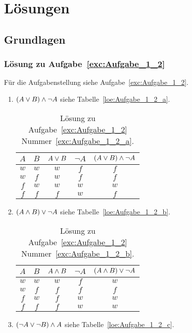 \chapter{Lösungen}
\section{Grundlagen}
\subsection{Lösung zu Aufgabe~\ref{exc:Aufgabe_1_2}}
Für die Aufgabenstellung siehe Aufgabe~\vref{exc:Aufgabe_1_2}.
\label{loe:Aufgabe_1_2}
\begin{enumerate}
\item $\left(A \vee B\right) \wedge \neg A$ siehe Tabelle~\vref{loe:Aufgabe_1_2_a}.
	\begin{table}[htb]
	\center
	\begin{tabular}{c|c||c|c|c}
	$A$ & $B$ & $A \vee B$ & $\neg A$ & $\left(A \vee B\right) \wedge \neg A$\\\hline
	$w$ & $w$ & $w$ & $f$ & $f$\\
	$w$ & $f$ & $w$ & $f$ & $f$\\
	$f$ & $w$ & $w$ & $w$ & $w$\\
	$f$ & $f$ & $f$ & $w$ & $f$\\
	\end{tabular}
	\caption{Lösung zu Aufgabe~\ref{exc:Aufgabe_1_2} Nummer~\ref{exc:Aufgabe_1_2_a}.}
	\label{loe:Aufgabe_1_2_a}
	\end{table}
\item $\left(A \wedge B\right) \vee \neg A$ siehe Tabelle~\vref{loe:Aufgabe_1_2_b}.
	\begin{table}[htb]
	\center
	\begin{tabular}{c|c||c|c|c}
	$A$ & $B$ & $A \wedge B$ & $\neg A$ & $\left(A \wedge B\right) \vee \neg A$\\\hline
	$w$ & $w$ & $w$ & $f$ & $w$\\
	$w$ & $f$ & $f$ & $f$ & $f$\\
	$f$ & $w$ & $f$ & $w$ & $w$\\
	$f$ & $f$ & $f$ & $w$ & $w$\\
	\end{tabular}
	\caption{Lösung zu Aufgabe~\ref{exc:Aufgabe_1_2} Nummer~\ref{exc:Aufgabe_1_2_b}.}
	\label{loe:Aufgabe_1_2_b}
	\end{table}
\item $\left(\neg A \vee \neg B\right) \wedge A$ siehe Tabelle~\vref{loe:Aufgabe_1_2_c}.
	\begin{table}[htb]

\end{table}
\end{enumerate}
